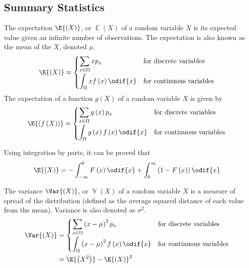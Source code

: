 \documentclass{article}
\begin{document}
\subsection{Summary Statistics}
\begin{definition}[Expectation]
    The expectation \(\E{\left( X \right)}\), or \(\operatorname{\mathbb{E}}{\left( X \right)}\)
    of a random variable \(X\) is its expected value given an
    infinite number of observations.
    The expectation is also known as the mean of the \(X\), denoted
    \(\mu\).
    \begin{equation*}
        \E{\left( X \right)} =
        \begin{cases}
            \displaystyle \sum_{x \in \Omega} x p_x                & \text{for discrete variables}   \\[0.4cm]
            \displaystyle \int_\Omega x f\left( x \right) \odif{x} & \text{for continuous variables}
        \end{cases}
    \end{equation*}
    The expectation of a function \(g\left( X \right)\) of a random variable \(X\) is given by
    \begin{equation*}
        \E{\left( f\left( X \right) \right)} =
        \begin{cases}
            \displaystyle \sum_{x \in \Omega} g\left( x \right) p_x                & \text{for discrete variables}   \\[0.4cm]
            \displaystyle \int_\Omega g\left( x \right) f\left( x \right) \odif{x} & \text{for continuous variables}
        \end{cases}
    \end{equation*}
\end{definition}
\begin{theorem}
    Using integration by parts, it can be proved that
    \begin{equation*}
        \E{\left(X\right)} = -\int_{-\infty}^0 F\left( x \right) \odif{x} + \int_0^\infty \left(1 - F\left( x \right)\right) \odif{x}
    \end{equation*}
\end{theorem}
\begin{definition}[Variance]
    The variance \(\Var{\left( X \right)}\), or \(\operatorname{\mathbb{V}}{\left( X \right)}\) of a random variable \(X\) is a measure of spread
    of the distribution (defined as the average squared distance of each value from the mean).
    Variance is also denoted as \(\sigma^2\).
    \begin{align*}
        \Var{\left( X \right)} & =
        \begin{cases}
            \displaystyle \sum_{x \in \Omega} \left( x - \mu \right)^2 p_x                  & \text{for discrete variables}   \\[0.4cm]
            \displaystyle \int_{\Omega} \left( x - \mu \right)^2 f\left( x \right) \odif{x} & \text{for continuous variables}
        \end{cases}
        \\
                               & = \E{\left( X^2 \right)} - \E{\left( X \right)}^2
    \end{align*}
\end{definition}
\end{document}
